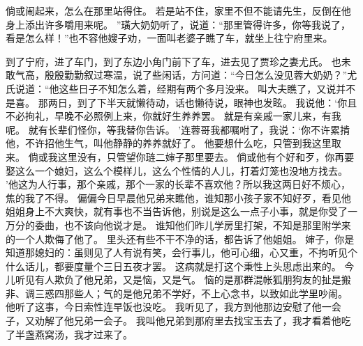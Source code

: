 倘或闹起来，怎么在那里站得住。
若是站不住，家里不但不能请先生，反倒在他身上添出许多嚼用来呢。
”璜大奶奶听了，说道：“那里管得许多，你等我说了，看是怎么样！”也不容他嫂子劝，一面叫老婆子瞧了车，就坐上往宁府里来。
\par
到了宁府，进了车门，到了东边小角门前下了车，进去见了贾珍之妻尤氏。
也未敢气高，殷殷勤勤叙过寒温，说了些闲话，方问道：“今日怎么没见蓉大奶奶？”尤氏说道：“他这些日子不知怎么着，经期有两个多月没来。
叫大夫瞧了，又说并不是喜。
那两日，到了下半天就懒待动，话也懒待说，眼神也发眩。
我说他：‘你且不必拘礼，早晚不必照例上来，你就好生养养罢。
就是有亲戚一家儿来，有我呢。
就有长辈们怪你，等我替你告诉。
’连蓉哥我都嘱咐了，我说：‘你不许累掯他，不许招他生气，叫他静静的养养就好了。
他要想什么吃，只管到我这里取来。
倘或我这里没有，只管望你琏二婶子那里要去。
倘或他有个好和歹，你再要娶这么一个媳妇，这么个模样儿，这么个性情的人儿，打着灯笼也没地方找去。
’他这为人行事，那个亲戚，那个一家的长辈不喜欢他？所以我这两日好不烦心，焦的我了不得。
偏偏今日早晨他兄弟来瞧他，谁知那小孩子家不知好歹，看见他姐姐身上不大爽快，就有事也不当告诉他，别说是这么一点子小事，就是你受了一万分的委曲，也不该向他说才是。
谁知他们昨儿学房里打架，不知是那里附学来的一个人欺侮了他了。
里头还有些不干不净的话，都告诉了他姐姐。
婶子，你是知道那媳妇的：虽则见了人有说有笑，会行事儿，他可心细，心又重，不拘听见个什么话儿，都要度量个三日五夜才罢。
这病就是打这个秉性上头思虑出来的。
今儿听见有人欺负了他兄弟，又是恼，又是气。
恼的是那群混帐狐朋狗友的扯是搬非、调三惑四那些人；气的是他兄弟不学好，不上心念书，以致如此学里吵闹。
他听了这事，今日索性连早饭也没吃。
我听见了，我方到他那边安慰了他一会子，又劝解了他兄弟一会子。
我叫他兄弟到那府里去找宝玉去了，我才看着他吃了半盏燕窝汤，我才过来了。
